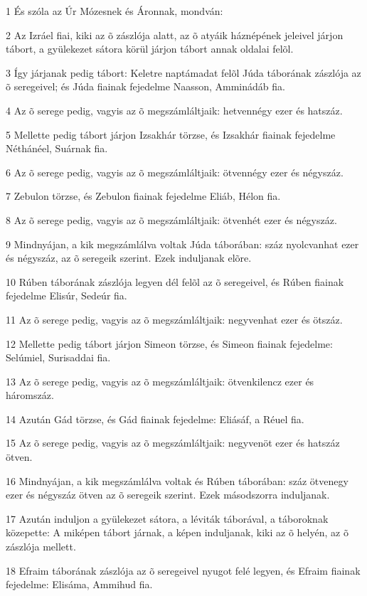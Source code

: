 \par 1 És szóla az Úr Mózesnek és Áronnak, mondván:
\par 2 Az Izráel fiai, kiki az õ zászlója alatt, az õ atyáik háznépének jeleivel járjon tábort, a gyülekezet sátora körül járjon tábort annak oldalai felõl.
\par 3 Így járjanak pedig tábort: Keletre naptámadat felõl Júda táborának zászlója az õ seregeivel; és Júda fiainak fejedelme Naasson, Amminádáb fia.
\par 4 Az õ serege pedig, vagyis az õ megszámláltjaik: hetvennégy ezer és hatszáz.
\par 5 Mellette pedig tábort járjon Izsakhár törzse, és Izsakhár fiainak fejedelme Néthánéel, Suárnak fia.
\par 6 Az õ serege pedig, vagyis az õ megszámláltjaik: ötvennégy ezer és négyszáz.
\par 7 Zebulon törzse, és Zebulon fiainak fejedelme Eliáb, Hélon fia.
\par 8 Az õ serege pedig, vagyis az õ megszámláltjaik: ötvenhét ezer és négyszáz.
\par 9 Mindnyájan, a kik megszámlálva voltak Júda táborában: száz nyolcvanhat ezer és négyszáz, az õ seregeik szerint. Ezek induljanak elõre.
\par 10 Rúben táborának zászlója legyen dél felõl az õ seregeivel, és Rúben fiainak fejedelme Elisúr, Sedeúr fia.
\par 11 Az õ serege pedig, vagyis az õ megszámláltjaik: negyvenhat ezer és ötszáz.
\par 12 Mellette pedig tábort járjon Simeon törzse, és Simeon fiainak fejedelme: Selúmiel, Surisaddai fia.
\par 13 Az õ serege pedig, vagyis az õ megszámláltjaik: ötvenkilencz ezer és háromszáz.
\par 14 Azután Gád törzse, és Gád fiainak fejedelme: Eliásáf, a Réuel fia.
\par 15 Az õ serege pedig, vagyis az õ megszámláltjaik: negyvenöt ezer és hatszáz ötven.
\par 16 Mindnyájan, a kik megszámlálva voltak és Rúben táborában: száz ötvenegy ezer és négyszáz ötven az õ seregeik szerint. Ezek másodszorra induljanak.
\par 17 Azután induljon a gyülekezet sátora, a léviták táborával, a táboroknak közepette: A miképen tábort járnak, a képen induljanak, kiki az õ helyén, az õ zászlója mellett.
\par 18 Efraim táborának zászlója az õ seregeivel nyugot felé legyen, és Efraim fiainak fejedelme: Elisáma, Ammihud fia.
